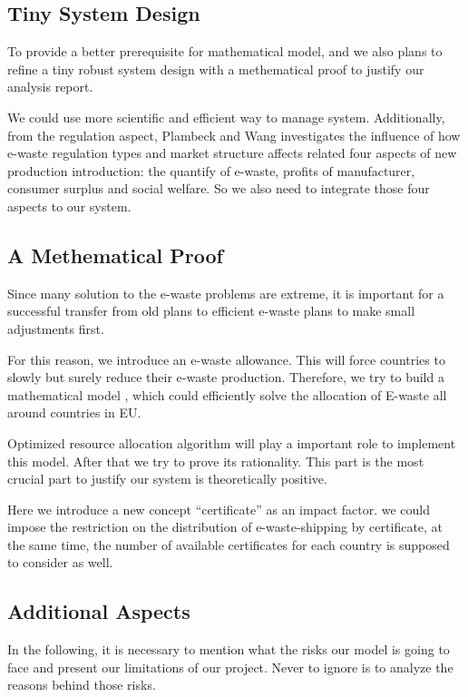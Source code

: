 \documentclass[sigchi-a, authorversion]{acmart}
\begin{document}
\subsection{Tiny System Design}

To provide a better prerequisite for mathematical model, and we also plans to 
refine a tiny robust system design with a methematical proof to justify our analysis report. 

We could use more scientific and efficient way \cite{shah2015overview}
to manage system. Additionally, from the regulation aspect, Plambeck and Wang 
\cite{plambeck2009effects} investigates the influence of how e-waste regulation 
types and market structure affects related four aspects of new production introduction: 
the quantify of e-waste, profits of manufacturer, consumer surplus and social welfare. 
So we also need to integrate those four aspects to our system.

\subsection{A Methematical Proof}

Since many solution to the e-waste problems are extreme, it is important for a 
successful transfer from old plans to efficient e-waste plans to make small 
adjustments first. 

For this reason, we introduce an e-waste allowance\cite{watanabe2005european}. 
This will force countries to slowly but surely reduce their e-waste production. 
Therefore, we try to build a mathematical model \cite{global-perspective}, which 
could efficiently solve the allocation of E-waste all around countries in EU. 

Optimized resource allocation algorithm will play a important role to implement 
this model.  After that we try to prove its rationality. This part is the most 
crucial part to justify our system is theoretically positive.

Here we introduce a new concept ``certificate'' as an impact factor. we could 
impose the restriction on the distribution of e-waste-shipping by certificate, 
at the same time,  the number of available certificates for each country is 
supposed to consider as well.

\subsection{Additional Aspects}

In the following, it is necessary to mention what the risks our model is going 
to face and present our limitations of our project. Never to ignore is to analyze 
the reasons behind those risks.
\end{document}
